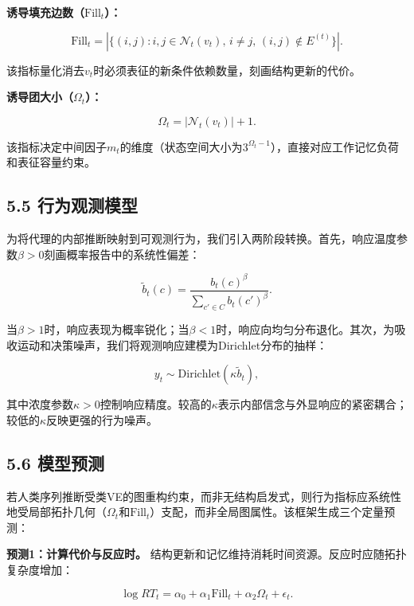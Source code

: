 \textbf{诱导填充边数（$\text{Fill}_t$）：}

\begin{equation*}
\text{Fill}_t=|\{(i,j):i,j\in\mathcal{N}_t(v_t),\,i\neq j,\,(i,j)\notin E^{(t)}\}|.
\end{equation*}

该指标量化消去$v_t$时必须表征的新条件依赖数量，刻画结构更新的代价。

\textbf{诱导团大小（$\Omega_t$）：}

\begin{equation*}
\Omega_t=|\mathcal{N}_t(v_t)|+1.
\end{equation*}

该指标决定中间因子$m_t$的维度（状态空间大小为$3^{\Omega_t-1}$），直接对应工作记忆负荷和表征容量约束。

\subsection*{5.5 行为观测模型}

为将代理的内部推断映射到可观测行为，我们引入两阶段转换。首先，响应温度参数$\beta>0$刻画概率报告中的系统性偏差：

\begin{equation*}
\tilde{b}_t(c)=\frac{b_t(c)^\beta}{\sum_{c'\in C}b_t(c')^\beta}.
\end{equation*}

当$\beta>1$时，响应表现为概率锐化；当$\beta<1$时，响应向均匀分布退化。其次，为吸收运动和决策噪声，我们将观测响应建模为Dirichlet分布的抽样：

\begin{equation*}
y_t\sim\text{Dirichlet}(\kappa\tilde{b}_t),
\end{equation*}

其中浓度参数$\kappa>0$控制响应精度。较高的$\kappa$表示内部信念与外显响应的紧密耦合；较低的$\kappa$反映更强的行为噪声。

\subsection*{5.6 模型预测}

若人类序列推断受类VE的图重构约束，而非无结构启发式，则行为指标应系统性地受局部拓扑几何（$\Omega_t$和$\text{Fill}_t$）支配，而非全局图属性。该框架生成三个定量预测：

\textbf{预测1：计算代价与反应时。} 结构更新和记忆维持消耗时间资源。反应时应随拓扑复杂度增加：

\begin{equation*}
\log RT_t=\alpha_0+\alpha_1\text{Fill}_t+\alpha_2\Omega_t+\epsilon_t.
\end{equation*}

